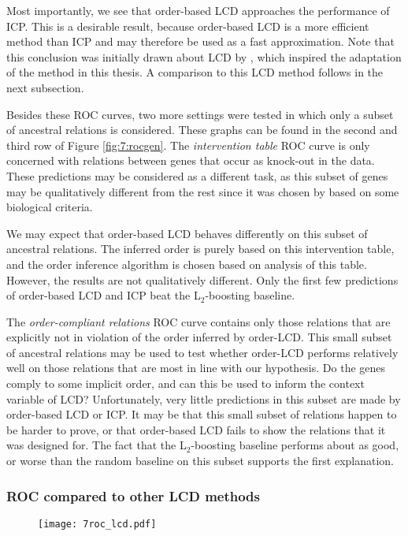 Most importantly, we see that order-based LCD approaches the performance of ICP. This is a desirable result, because order-based LCD is a more efficient method than ICP and may therefore be used as a fast approximation. Note that this conclusion was initially drawn about LCD by \citet{versteeg2019boosting}, which inspired the adaptation of the method in this thesis. A comparison to this LCD method follows in the next subsection.

Besides these ROC curves, two more settings were tested in which only a subset of ancestral relations is considered. These graphs can be found in the second and third row of Figure \ref{fig:7:rocgen}. The \textit{intervention table} ROC curve is only concerned with relations between genes that occur as knock-out in the data. These predictions may be considered as a different task, as this subset of genes may be qualitatively different from the rest since it was chosen by \citet{kemmeren2014large} based on some biological criteria. 

We may expect that order-based LCD behaves differently on this subset of ancestral relations. The inferred order is purely based on this intervention table, and the order inference algorithm is chosen based on analysis of this table. However, the results are not qualitatively different. Only the first few predictions of order-based LCD and ICP beat the L$_2$-boosting baseline.

The \textit{order-compliant relations} ROC curve contains only those relations that are explicitly not in violation of the order inferred by order-LCD. This small subset of ancestral relations may be used to test whether order-LCD performs relatively well on those relations that are most in line with our hypothesis. Do the genes comply to some implicit order, and can this be used to inform the context variable of LCD? Unfortunately, very little predictions in this subset are made by order-based LCD or ICP. It may be that this small subset of relations happen to be harder to prove, or that order-based LCD fails to show the relations that it was designed for. The fact that the L$_2$-boosting baseline performs about as good, or worse than the random baseline on this subset supports the first explanation.


\subsubsection{ROC compared to other LCD methods}

\begin{figure}[h]
    \centering
    \texttt{[image: 7roc\_lcd.pdf]}
    \caption{}
    \label{fig:7:roclcd}
\end{figure}

